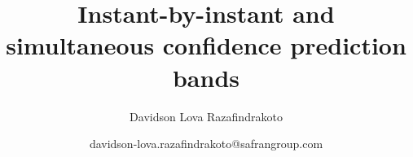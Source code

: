 \documentclass[11pt]{article}
\begin{document}
\author[1, 2]{Davidson Lova Razafindrakoto}

\title{
    Instant-by-instant and simultaneous confidence prediction bands
}

\date{davidson-lova.razafindrakoto@safrangroup.com}

\maketitle






\end{document}

